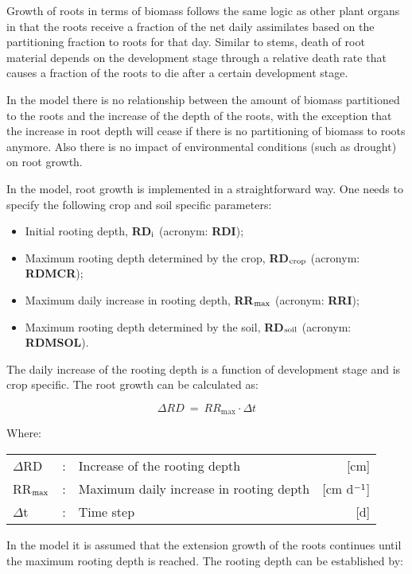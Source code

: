Growth of roots in terms of biomass follows the same logic as other plant organs in that
the roots receive a fraction of the net daily assimilates based on the partitioning 
fraction to roots for that day. Similar to stems, death of root material depends on 
the development stage through a relative death rate that causes a fraction of the 
roots to die after a certain development stage.

In the model there is no relationship between the amount of biomass partitioned to the roots 
and the increase of the depth of the roots, with the exception that the increase in root
depth will cease if there is no partitioning of biomass to roots anymore. Also there is 
no impact of environmental conditions (such as drought) on root growth.

In the model, root growth is implemented in a straightforward way. One needs to specify
the following crop and soil specific parameters:
\begin{itemize}
	\item Initial rooting depth, {\bf RD$_{{\rm i}}$} (acronym: {\bf RDI});
	\item Maximum rooting depth determined by the crop, {\bf RD$_{{\rm crop}}$} (acronym: {\bf RDMCR});
	\item Maximum daily increase in rooting depth, {\bf RR$_{{\rm max}}$} (acronym: {\bf RRI});
	\item Maximum rooting depth determined by the soil, {\bf RD$_{{\rm soil}}$} (acronym: {\bf RDMSOL}).
\end{itemize}

The daily increase of the rooting depth is a function of development stage and is crop
specific. The root growth can be calculated as:

\begin{equation}
\Delta RD~=~RR_{\max} \cdot \Delta t
\end{equation}

Where:\\[5pt]
\begin{tabularx}{\textwidth}{llXr}
	$\Delta$RD &:& Increase of the rooting depth   &   [cm]\\
	RR$_{{\rm max}}$ &:& Maximum daily increase in rooting depth  &  [cm d$^{{\rm -}{1}}$]\\
	$\Delta$t &:& Time step   &  [d]\\
\end{tabularx}

In the model it is assumed that the extension growth of the roots continues until the
maximum rooting depth is reached. The rooting depth can be established by:

